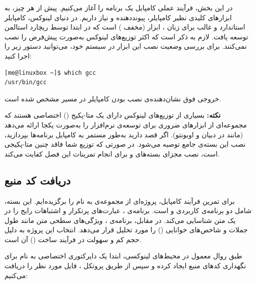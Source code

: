 در این بخش، فرآیند عملی کامپایل یک برنامه را آغاز می‌کنیم. پیش از هر چیز، به ابزارهای کلیدی نظیر کامپایلر، پیونددهنده و  نیاز داریم. در دنیای لینوکس، کامپایلر استاندارد و غالب برای زبان ، ابزار  (مخفف ) است که در ابتدا توسط ریچارد استالمن توسعه یافت. لازم به ذکر است که اکثر توزیع‌های لینوکس به‌صورت پیش‌فرض  را نصب نمی‌کنند. برای بررسی وضعیت نصب این ابزار در سیستم خود، می‌توانید دستور زیر را اجرا کنید:

\begin{latin}
\begin{lstlisting}
[me@linuxbox ~]$ which gcc
/usr/bin/gcc
\end{lstlisting}
\end{latin}

خروجی فوق نشان‌دهنده‌ی نصب بودن کامپایلر در مسیر مشخص شده است.

\begin{note}
\textbf{نکته:} بسیاری از توزیع‌های لینوکس دارای یک متا-پکیج () اختصاصی هستند که مجموعه‌ای از ابزارهای ضروری برای توسعه‌ی نرم‌افزار را به‌صورت یکجا ارائه می‌دهد (مانند  در دبیان و اوبونتو). اگر قصد دارید به‌طور مستمر به کامپایل برنامه‌ها بپردازید، نصب این بسته‌ی جامع توصیه می‌شود. در صورتی که توزیع شما فاقد چنین متا-پکیجی است، نصب مجزای بسته‌های  و  برای انجام تمرینات این فصل کفایت می‌کند.
\end{note}

\subsection{دریافت کد منبع}

برای تمرین فرآیند کامپایل، پروژه‌ای از مجموعه‌ی  به نام  را برگزیده‌ایم. این بسته، شامل دو برنامه‌ی کاربردی  و  است. برنامه‌ی ، عبارت‌های پرتکرار و اشتباهات رایج را در یک متن شناسایی می‌کند. در مقابل، برنامه‌ی ، ویژگی‌های سطحی متن مانند طول جملات و شاخص‌های خوانایی () را مورد تحلیل قرار می‌دهد. انتخاب این پروژه به دلیل حجم کم و سهولت در فرآیند ساخت () آن است.

طبق روال معمول در محیط‌های لینوکسی، ابتدا یک دایرکتوری اختصاصی به نام  برای نگهداری کدهای منبع ایجاد کرده و سپس از طریق پروتکل ، فایل مورد نظر را دریافت می‌کنیم:


